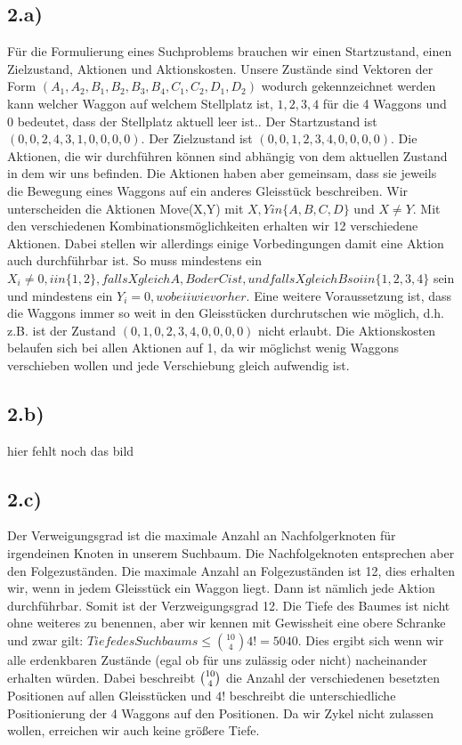 \documentclass[a4paper]{article}
\begin{document}
\subsection*{2.a)}
F\"ur die Formulierung eines Suchproblems brauchen wir einen Startzustand, einen Zielzustand, Aktionen und Aktionskosten. Unsere Zustände sind Vektoren der Form $(A_1,A_2,B_1,B_2,B_3,B_4,C_1,C_2,D_1,D_2)$ wodurch gekennzeichnet werden kann welcher Waggon auf welchem Stellplatz ist, $1,2,3,4$ f\"ur die 4 Waggons und 0 bedeutet, dass der Stellplatz aktuell leer ist.. Der Startzustand ist $(0,0,2,4,3,1,0,0,0,0)$. Der Zielzustand ist $(0,0,1,2,3,4,0,0,0,0)$. Die Aktionen, die wir durchf\"uhren k\"onnen sind abh\"angig von dem aktuellen Zustand in dem wir uns befinden. Die Aktionen haben aber gemeinsam, dass sie jeweils die Bewegung eines Waggons auf ein anderes Gleisst\"uck beschreiben.
Wir unterscheiden die Aktionen Move(X,Y) mit $X,Y in \{A,B,C,D\}$ und $X \not= Y$. Mit den verschiedenen Kombinationsmöglichkeiten erhalten wir 12 verschiedene Aktionen. Dabei stellen wir allerdings einige Vorbedingungen damit eine Aktion auch durchf\"uhrbar ist. So muss mindestens ein $X_i \not= 0,i in \{1,2\}, falls X gleich A,B oder C ist, und falls X gleich B so i in \{1,2,3,4\}$ sein und mindestens ein $Y_i = 0, wobei i wie vorher$.
Eine weitere Voraussetzung ist, dass die Waggons immer so weit in den Gleisst\"ucken durchrutschen wie m\"oglich, d.h. z.B. ist der Zustand $(0,1,0,2,3,4,0,0,0,0)$ nicht erlaubt.
Die Aktionskosten belaufen sich bei allen Aktionen auf 1, da wir m\"oglichst wenig Waggons verschieben wollen und jede Verschiebung gleich aufwendig ist.

\subsection*{2.b)}
hier fehlt noch das bild

\subsection*{2.c)}
Der Verweigungsgrad ist die maximale Anzahl an Nachfolgerknoten f\"ur irgendeinen Knoten in unserem Suchbaum. Die Nachfolgeknoten entsprechen aber den Folgezust\"anden. Die maximale Anzahl an Folgezust\"anden ist 12, dies erhalten wir, wenn in jedem Gleisst\"uck ein Waggon liegt. Dann ist n\"amlich jede Aktion durchf\"uhrbar. Somit ist der Verzweigungsgrad 12.
Die Tiefe des Baumes ist nicht ohne weiteres zu benennen, aber wir kennen mit Gewissheit eine obere Schranke und zwar gilt: $Tiefe des Suchbaums \le \binom{10}{4} 4! = 5040$. Dies ergibt sich wenn wir alle erdenkbaren Zust\"ande (egal ob f\"ur uns zul\"assig oder nicht) nacheinander erhalten würden. Dabei beschreibt $\tbinom{10}{4}$ die Anzahl der verschiedenen besetzten Positionen auf allen Gleisst\"ucken und $4!$ beschreibt die unterschiedliche Positionierung der 4 Waggons auf den Positionen. Da wir Zykel nicht zulassen wollen, erreichen wir auch keine gr\"o{\ss}ere Tiefe.
\end{document}
